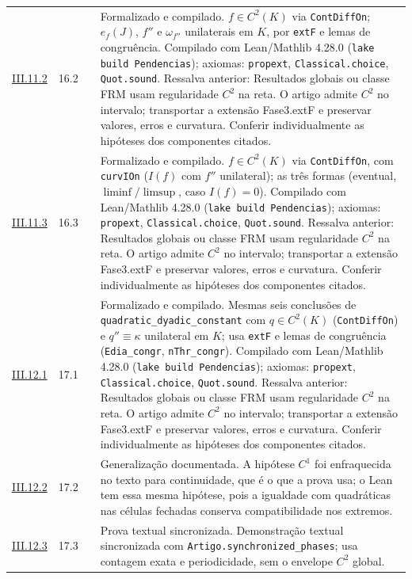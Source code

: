 \documentclass[12pt,a4paper]{article}
\theoremstyle{preciso}
\theoremstyle{definition}
\newcommand{\code}[1]{\nolinkurl{#1}}
\theoremstyle{preciso}
\theoremstyle{preciso}
\theoremstyle{preciso}
\theoremstyle{preciso}
\theoremstyle{definition}
\theoremstyle{preciso}
\theoremstyle{definition}
\theoremstyle{preciso}
\theoremstyle{preciso}
\theoremstyle{definition}
\begin{document}
\begin{singlespace}
\begin{longtable}{@{}p{.11\linewidth}p{.09\linewidth}p{.09\linewidth}p{.59\linewidth}@{}}
\hyperref[map:artigo_2:11.2]{III.11.2} & 16.2 & \pageref{map:artigo_2:11.2} & Formalizado e compilado. $f\in C^2(K)$ via \texttt{ContDiffOn}; $e_f(J)$, $f''$ e $\omega_{f''}$ unilaterais em $K$, por \texttt{extF} e lemas de congruência. Compilado com Lean/Mathlib 4.28.0 (\texttt{lake build Pendencias}); axiomas: \texttt{propext}, \texttt{Classical.choice}, \texttt{Quot.sound}. Ressalva anterior: Resultados globais ou classe FRM usam regularidade $C^2$ na reta. O artigo admite $C^2$ no intervalo; transportar a extensão Fase3.extF e preservar valores, erros e curvatura. Conferir individualmente as hipóteses dos componentes citados.\\[4pt]
\hyperref[map:artigo_2:11.3]{III.11.3} & 16.3 & \pageref{map:artigo_2:11.3} & Formalizado e compilado. $f\in C^2(K)$ via \texttt{ContDiffOn}, com \texttt{curvIOn} ($I(f)$ com $f''$ unilateral); as três formas (eventual, $\liminf/\limsup$, caso $I(f)=0$). Compilado com Lean/Mathlib 4.28.0 (\texttt{lake build Pendencias}); axiomas: \texttt{propext}, \texttt{Classical.choice}, \texttt{Quot.sound}. Ressalva anterior: Resultados globais ou classe FRM usam regularidade $C^2$ na reta. O artigo admite $C^2$ no intervalo; transportar a extensão Fase3.extF e preservar valores, erros e curvatura. Conferir individualmente as hipóteses dos componentes citados.\\[4pt]
\hyperref[map:artigo_2:12.1]{III.12.1} & 17.1 & \pageref{map:artigo_2:12.1} & Formalizado e compilado. Mesmas seis conclusões de \texttt{quadratic\_dyadic\_constant} com $q\in C^2(K)$ (\texttt{ContDiffOn}) e $q''\equiv\kappa$ unilateral em $K$; usa \texttt{extF} e lemas de congruência (\texttt{Edia\_congr}, \texttt{nThr\_congr}). Compilado com Lean/Mathlib 4.28.0 (\texttt{lake build Pendencias}); axiomas: \texttt{propext}, \texttt{Classical.choice}, \texttt{Quot.sound}. Ressalva anterior: Resultados globais ou classe FRM usam regularidade $C^2$ na reta. O artigo admite $C^2$ no intervalo; transportar a extensão Fase3.extF e preservar valores, erros e curvatura. Conferir individualmente as hipóteses dos componentes citados.\\[4pt]
\hyperref[map:artigo_2:12.2]{III.12.2} & 17.2 & \pageref{map:artigo_2:12.2} & Generalização documentada. A hipótese $C^1$ foi enfraquecida no texto para continuidade, que é o que a prova usa; o Lean tem essa mesma hipótese, pois a igualdade com quadráticas nas células fechadas conserva compatibilidade nos extremos.\\[4pt]
\hyperref[map:artigo_2:12.3]{III.12.3} & 17.3 & \pageref{map:artigo_2:12.3} & Prova textual sincronizada. Demonstração textual sincronizada com \code{Artigo.synchronized_phases}; usa contagem exata e periodicidade, sem o envelope $C^2$ global.\\[4pt]

\end{longtable}
\end{singlespace}
\end{document}
